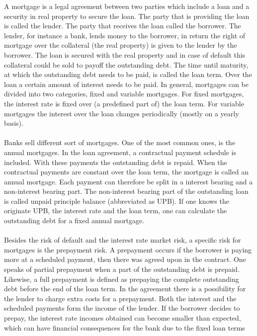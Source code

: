 A mortgage is a legal agreement between two parties which include a loan and 
a security in real property to secure the loan. The party that is providing 
the loan is called the lender. The party that receives the loan called 
the borrower. 
The lender, for instance a bank, lends money to the borrower, in return 
the right of mortgage over the collateral (the real property) is given to 
the lender by the borrower.
The loan is secured with the real property and in case of default 
this collateral could be sold to payoff the outstanding debt. The time 
until maturity, at which the outstanding debt needs to be paid, is 
called the loan term. 
Over the loan a certain amount of interest needs to be paid. In general, 
mortgages can be divided into two categories, fixed and variable 
mortgages. For fixed mortgages, the interest rate is fixed over 
(a predefined part of) the loan term. For variable mortgages the 
interest over the loan changes periodically (mostly on a yearly basis).
\\\\
Banks sell different sort of mortgages. 
One of the most common ones, is the annual mortgages.  
In the loan agreement, a contractual payment schedule is included. 
With these payments the outstanding debt is repaid. When the contractual
payments are constant over the loan term, the mortgage is called 
an annual mortgage. Each payment can therefore be split in a 
interest bearing and a non-interest bearing part. The non-interest 
bearing part of the outstanding loan is called unpaid principle 
balance (abbreviated as UPB). If one knows the originate UPB, 
the interest rate and the loan term, one can calculate the 
outstanding debt for a fixed annual mortgage.  
\\\\
Besides the risk of default and the interest rate market risk, 
a specific risk for mortgages is the prepayment risk. A prepayment 
occurs if the borrower is paying more at a scheduled payment, then there 
was agreed upon in the contract. One speaks of partial 
prepayment when a part of the outstanding debt is prepaid. 
Likewise, a full prepayment is defined as prepaying the complete 
outstanding debt before the end of the loan term. In the agreement 
there is a possibility for the lender to charge extra costs for a prepayment. 
Both the interest and the scheduled payments 
form the income of the lender. If the borrower decides to prepay, 
the interest rate incomes obtained can become smaller than expected, which 
can have financial consequences for the bank due to the fixed loan terms
